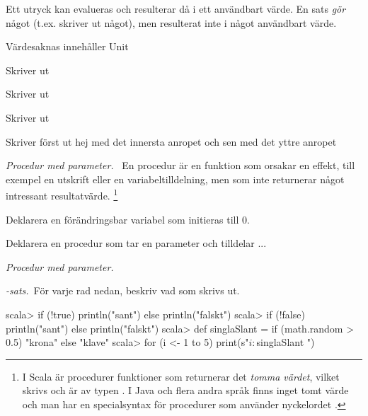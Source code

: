 \TaskSolved \what

\SubtaskSolved  Ett utryck kan evalueras och resulterar då i ett användbart värde. En sats \emph{gör} något (t.ex. skriver ut något), men resulterat inte i något användbart värde.

\SubtaskSolved {}

\SubtaskSolved 

 Värdesaknas innehåller Unit

 Skriver ut 

 Skriver ut 

 Skriver ut 

 Skriver först ut hej med det innersta anropet och sen \code{()} med det yttre anropet

\SubtaskSolved  {}

\SubtaskSolved  {}

\QUESTEND



\def\what{\emph{Procedur med parameter.} \TODO}

\QUESTBEGIN

\Task \what~En procedur är en funktion som orsakar en effekt, till exempel en utskrift eller en variabeltilldelning, men som inte returnerar något intressant resultatvärde. \footnote{I Scala är procedurer funktioner som returnerar det \emph{tomma värdet}, vilket skrivs \code{()} och är av typen . I Java och flera andra språk finns inget tomt värde och man har en specialsyntax för procedurer som använder nyckelordet . }

\Subtask Deklarera en förändringsbar variabel  som initieras till 0.

\Subtask Deklarera en procedur  som tar en parameter  och tilldelar  \TODO ...


\SOLUTION

\TaskSolved \what

\SubtaskSolved 

\QUESTEND





\def\what{\emph{\textit{-sats}.}}

\QUESTBEGIN

\Task \what~För varje rad nedan, beskriv vad som skrivs ut.  %
\begin{REPL}
scala> if (!true) println("sant") else println("falskt")
scala> if (!false) println("sant") else println("falskt")
scala> def singlaSlant = if (math.random > 0.5) "krona" else "klave"
scala> for (i <- 1 to 5) print(s"$i:$singlaSlant ")
\end{REPL}

